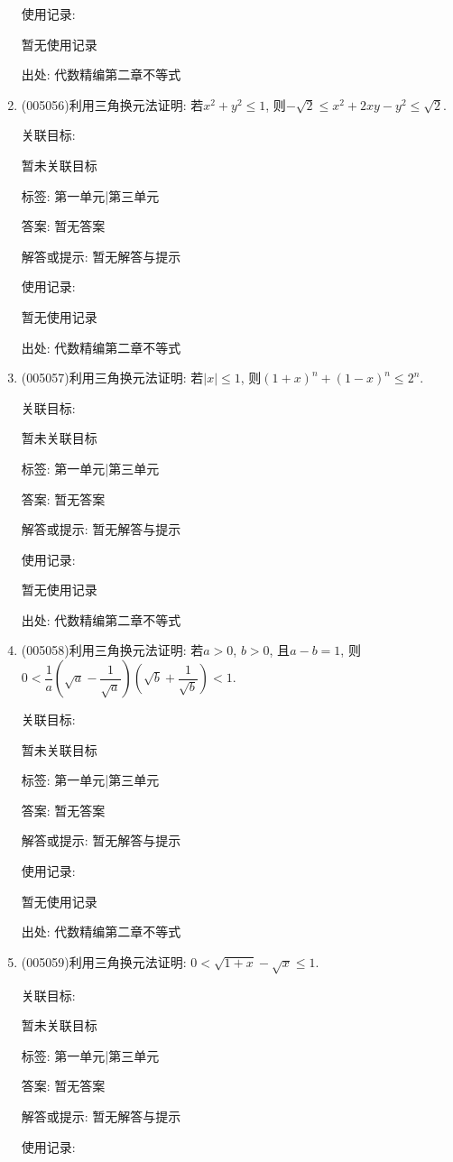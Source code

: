 \documentclass[10pt,a4paper]{article}
\begin{document}
\begin{enumerate}[1.]
使用记录:

暂无使用记录


出处: 代数精编第二章不等式
\item { (005056)}利用三角换元法证明: 若$x^2+y^2\le 1$, 则$-\sqrt 2\le x^2+2xy-y^2\le \sqrt 2$.


关联目标:

暂未关联目标



标签: 第一单元|第三单元

答案: 暂无答案

解答或提示: 暂无解答与提示

使用记录:

暂无使用记录


出处: 代数精编第二章不等式
\item { (005057)}利用三角换元法证明: 若$|x|\le 1$, 则$(1+x)^n+(1-x)^n\le 2^n$.


关联目标:

暂未关联目标



标签: 第一单元|第三单元

答案: 暂无答案

解答或提示: 暂无解答与提示

使用记录:

暂无使用记录


出处: 代数精编第二章不等式
\item { (005058)}利用三角换元法证明: 若$a>0$, $b>0$, 且$a-b=1$, 则$0<\dfrac 1a(\sqrt a-\dfrac 1{\sqrt a})(\sqrt b+\dfrac 1{\sqrt b})<1$.


关联目标:

暂未关联目标



标签: 第一单元|第三单元

答案: 暂无答案

解答或提示: 暂无解答与提示

使用记录:

暂无使用记录


出处: 代数精编第二章不等式
\item { (005059)}利用三角换元法证明: $0<\sqrt{1+x}-\sqrt x\le 1$.


关联目标:

暂未关联目标



标签: 第一单元|第三单元

答案: 暂无答案

解答或提示: 暂无解答与提示

使用记录:


\end{enumerate}
\end{document}
